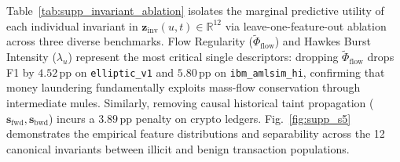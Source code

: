 \documentclass[journal,twoside]{IEEEtran}
\begin{document}
Table~\ref{tab:supp_invariant_ablation} isolates the marginal predictive utility of each individual invariant in $\mathbf{z}_{\text{inv}}(u, t) \in \mathbb{R}^{12}$ via leave-one-feature-out ablation across three diverse benchmarks. Flow Regularity ($\tilde{\Phi}_{\text{flow}}$) and Hawkes Burst Intensity ($\lambda_u$) represent the most critical single descriptors: dropping $\tilde{\Phi}_{\text{flow}}$ drops F1 by $4.52$\,pp on \texttt{elliptic\_v1} and $5.80$\,pp on \texttt{ibm\_amlsim\_hi}, confirming that money laundering fundamentally exploits mass-flow conservation through intermediate mules. Similarly, removing causal historical taint propagation ($\mathbf{s}_{\text{fwd}}, \mathbf{s}_{\text{bwd}}$) incurs a $3.89$\,pp penalty on crypto ledgers. Fig.~\ref{fig:supp_s5} demonstrates the empirical feature distributions and separability across the 12 canonical invariants between illicit and benign transaction populations.
\end{document}
